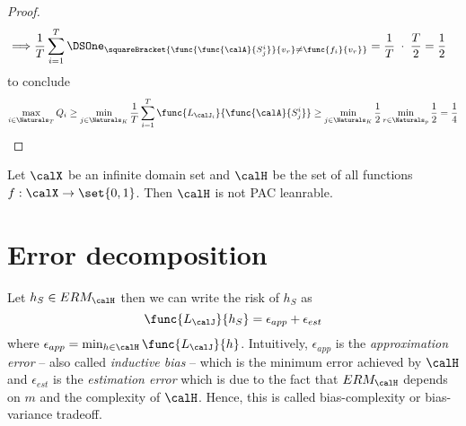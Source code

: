 \begin{proof}
\begin{align*}
        \implies & \dfrac{1}{T} \sum_{i = 1}^T \DSOne_{\squareBracket{\func{\func{\calA}{S^i_j}}{v_r} \neq \func{f_i}{v_r}}} = \dfrac{1}{T} \; \cdot \; \dfrac{T}{2} = \dfrac{1}{2}
    \end{align*}
    to conclude 
    \begin{equation*}
        \max_{i \in \Naturals_T} Q_i \geq \min_{j \in \Naturals_K} \dfrac{1}{T} \sum_{i = 1}^T \func{L_{\calJ_i}}{\func{\calA}{S^i_j}} \geq \min_{j \in \Naturals_K}\dfrac{1}{2} \min_{r\in \Naturals_p} \dfrac{1}{2} = \dfrac{1}{4}
    \end{equation*}
\end{proof}

\begin{corollary}
    Let \(\calX\) be an infinite domain set and \(\calH\) be the set of all functions \(f: \calX \to \set{0,1}\). Then \(\calH\) is not PAC leanrable.
\end{corollary}

\section{Error decomposition}
Let \(h_S \in ERM_{\calH}\) then we can write the risk of \(h_S\) as
\begin{equation*}
    \func{L_{\calJ}}{h_S} = \epsilon_{app} + \epsilon_{est}
\end{equation*}
where \(\epsilon_{app} = \min_{h \in \calH} \func{L_{\calJ}}{h}\). Intuitively, \(\epsilon_{app}\) is the \textit{approximation error} -- also called \textit{inductive bias} -- which is the minimum error achieved by \(\calH\) and \(\epsilon_{est}\) is the \textit{estimation error} which is due to the fact that \(ERM_{\calH}\) depends on \(m\) and the complexity of \(\calH\). Hence, this is called bias-complexity or bias-variance tradeoff. 